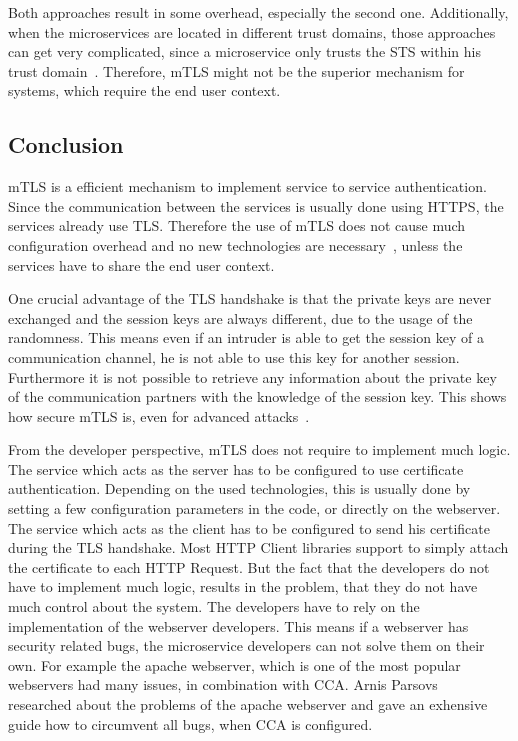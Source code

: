 Both approaches result in some overhead, especially the second one.
Additionally, when the microservices are located in different trust domains, those approaches can get very complicated, since a microservice only trusts the STS within his trust domain~\cite{dias2020microservices}.
Therefore, mTLS might not be the superior mechanism for systems, which require the end user context.

\subsection{Conclusion}
mTLS is a efficient mechanism to implement service to service authentication.
Since the communication between the services is usually done using HTTPS, the services already use TLS.
Therefore the use of mTLS does not cause much configuration overhead and no new technologies are necessary~\cite{dias2020microservices}, unless the services have to share the end user context.

One crucial advantage of the TLS handshake is that the private keys are never exchanged and the session keys are always different, due to the usage of the randomness.
This means even if an intruder is able to get the session key of a communication channel, he is not able to use this key for another session.
Furthermore it is not possible to retrieve any information about the private key of the communication partners with the knowledge of the session key.
This shows how secure mTLS is, even for advanced attacks~\cite{parsovs2013practical}.

From the developer perspective, mTLS does not require to implement much logic.
The service which acts as the server has to be configured to use certificate authentication.
Depending on the used technologies, this is usually done by setting a few configuration parameters in the code, or directly on the webserver.
The service which acts as the client has to be configured to send his certificate during the TLS handshake.
Most HTTP Client libraries support to simply attach the certificate to each HTTP Request.
But the fact that the developers do not have to implement much logic, results in the problem, that they do not have much control about the system.
The developers have to rely on the implementation of the webserver developers.
This means if a webserver has security related bugs, the microservice developers can not solve them on their own.
For example the apache webserver, which is one of the most popular webservers had many issues, in combination with CCA.
Arnis Parsovs~\cite{parsovs2013practical} researched about the problems of the apache webserver and gave an exhensive guide how to circumvent all bugs, when CCA is configured.

